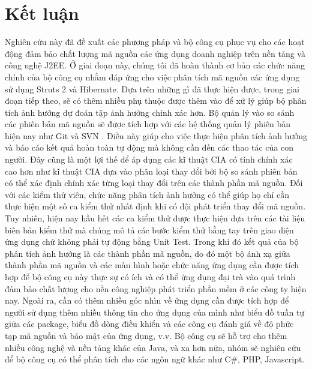 \documentclass[12pt]{report}
\begin{document}
\chapter{Kết luận}
Nghiên cứu này đã đề xuất các phương pháp và bộ công cụ phục vụ cho các hoạt động đảm bảo chất lượng mã nguồn các ứng dụng doanh nghiệp trên nền tảng và công nghệ J2EE. Ở giai đoạn này, chúng tôi đã hoàn thành cơ bản các chức năng chính của bộ công cụ nhằm đáp ứng cho việc phân tích mã nguồn các ứng dụng sử dụng Struts 2 và Hibernate. Dựa trên những gì đã thực hiện được, trong giai đoạn tiếp theo, sẽ có thêm nhiều phụ thuộc được thêm vào để xử lý giúp bộ phân tích ảnh hưởng dự đoán tập ảnh hưởng chính xác hơn. Bộ quản lý vào so sánh các phiên bản mã nguồn sẽ được tích hợp với các hệ thống quản lý phiên bản hiện nay như Git  và SVN . Điều này giúp cho việc thực hiện phân tích ảnh hưởng và báo cáo kết quả hoàn toàn tự động mà không cần đến các thao tác của con người. Đây cũng là một lợi thế để áp dụng các kĩ thuật CIA có tính chính xác cao hơn như kĩ thuật CIA dựa vào phân loại thay đổi bởi bộ so sánh phiên bản có thể xác định chính xác từng loại thay đổi trên các thành phần mã nguồn. Đối với các kiểm thử viên, chức năng phân tích ảnh hưởng có thể giúp họ chỉ cần thực hiện một số ca kiểm thử nhất định khi có đội phát triển thay đổi mã nguồn. Tuy nhiên, hiện nay hầu hết các ca kiểm thử được thực hiện dựa trên các tài liệu biên bản kiểm thử mà chúng mô tả các bước kiểm thử bằng tay trên giao diện ứng dụng chứ không phải tự động bằng Unit Test. Trong khi đó kết quả của bộ phân tích ảnh hưởng là các thành phần mã nguồn, do đó một bộ ánh xạ giữa thành phần mã nguồn và các màn hình hoặc chức năng ứng dụng cần được tích hợp để bộ công cụ này thực sự có ích và có thể ứng dụng đại trà vào quá trình đảm bảo chất lượng cho nền công nghiệp phát triển phần mềm ở các công ty hiện nay. Ngoài ra, cần có thêm nhiều góc nhìn về ứng dụng cần được tích hợp để người sử dụng thêm nhiều thông tin cho ứng dụng của mình như biểu đồ tuần tự giữa các package, biểu đồ dòng điều khiển và các công cụ đánh giá về độ phức tạp mã nguồn và bảo mật của ứng dụng, v.v. Bộ công cụ sẽ hỗ trợ cho thêm nhiều công nghệ và nền tảng khác của Java, và xa hơn nữa, nhóm sẽ nghiên cứu để bộ công cụ có thể phân tích cho các ngôn ngữ khác như C\#, PHP, Javascript.
\end{document}
